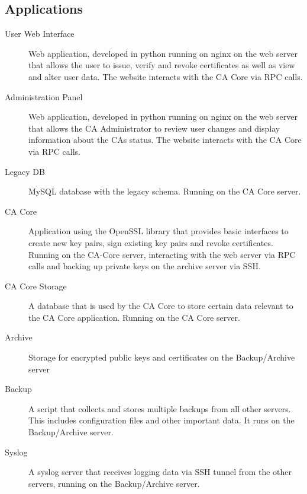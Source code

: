 \documentclass[a4paper, toc=index, 12pt, DIV14, twoside, BCOR2cm, headsepline, numbers=noenddot, bibliography=totoc]{report}
\begin{document}
\subsection{Applications}

\begin{description}
\item[User Web Interface ] Web application, developed in python running on nginx on the web server that allows the user to issue, verify and revoke certificates as well as view and alter user data. The website interacts with the CA Core via RPC calls.

\item[Administration Panel ] Web application, developed in python running on nginx on the web server that allows the CA Administrator to review user changes and display information about the CAs status. The website interacts with the CA Core via RPC calls.

\item[Legacy DB ] MySQL database with the legacy schema. Running on the CA Core server.

\item[CA Core ] Application using the OpenSSL library that provides basic interfaces to create new key pairs, sign existing key pairs and revoke certificates. Running on the CA-Core server,  interacting with the web server via RPC calls and backing up private keys on the archive server via SSH.

\item[CA Core Storage ] A database that is used by the CA Core to store certain data relevant to the CA Core application. Running on the CA Core server.

\item[Archive] Storage for encrypted public keys and certificates on the Backup/Archive server

\item[Backup ] A script that collects and stores multiple backups from all other servers. This includes configuration files and other important data. It runs on the Backup/Archive server.

\item[Syslog ] A syslog server that receives logging data via SSH tunnel from the other servers, running on the Backup/Archive server.
\end{description}
\end{document}
